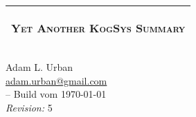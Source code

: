 
\setlength{\parindent}{0 pt}
\pagestyle{empty}


\begin{center}
\begin{tabular}{c}
\hline
\begin{LARGE} \textsc{Yet Another KogSys Summary} \end{LARGE} \\ \hline
\end{tabular}
\end{center}

\vspace{1cm}


\vfill

\begin{center}
Adam L. Urban \\ \href{mailto:adam.urban@gmail.com}{adam.urban@gmail.com} \\ \LaTeXe -- Build vom \today \\ \textsl{Revision:} 5
\end{center}


\cleardoublepage

\pagestyle{headings}




